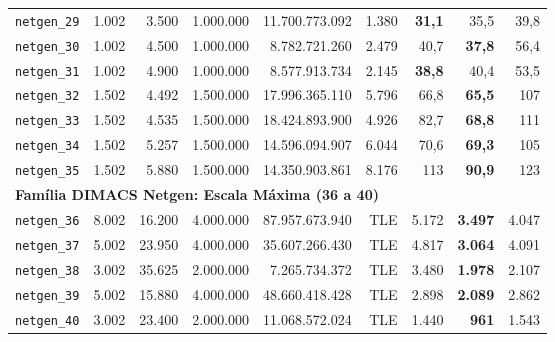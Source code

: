 \begin{longtable}{lrrrrrrrr}
\texttt{netgen\_29} & 1.002 & 3.500 & 1.000.000 & 11.700.773.092 & 1.380 & \textbf{31,1} & 35,5 & 39,8 \\
\texttt{netgen\_30} & 1.002 & 4.500 & 1.000.000 & 8.782.721.260 & 2.479 & 40,7 & \textbf{37,8} & 56,4 \\
\texttt{netgen\_31} & 1.002 & 4.900 & 1.000.000 & 8.577.913.734 & 2.145 & \textbf{38,8} & 40,4 & 53,5 \\
\texttt{netgen\_32} & 1.502 & 4.492 & 1.500.000 & 17.996.365.110 & 5.796 & 66,8 & \textbf{65,5} & 107 \\
\texttt{netgen\_33} & 1.502 & 4.535 & 1.500.000 & 18.424.893.900 & 4.926 & 82,7 & \textbf{68,8} & 111 \\
\texttt{netgen\_34} & 1.502 & 5.257 & 1.500.000 & 14.596.094.907 & 6.044 & 70,6 & \textbf{69,3} & 105 \\
\texttt{netgen\_35} & 1.502 & 5.880 & 1.500.000 & 14.350.903.861 & 8.176 & 113 & \textbf{90,9} & 123 \\
\midrule
\multicolumn{9}{l}{\textbf{Família DIMACS Netgen: Escala Máxima (36 a 40)}} \\
\midrule
\texttt{netgen\_36} & 8.002 & 16.200 & 4.000.000 & 87.957.673.940 & TLE & 5.172 & \textbf{3.497} & 4.047 \\
\texttt{netgen\_37} & 5.002 & 23.950 & 4.000.000 & 35.607.266.430 & TLE & 4.817 & \textbf{3.064} & 4.091 \\
\texttt{netgen\_38} & 3.002 & 35.625 & 2.000.000 & 7.265.734.372 & TLE & 3.480 & \textbf{1.978} & 2.107 \\
\texttt{netgen\_39} & 5.002 & 15.880 & 4.000.000 & 48.660.418.428 & TLE & 2.898 & \textbf{2.089} & 2.862 \\
\texttt{netgen\_40} & 3.002 & 23.400 & 2.000.000 & 11.068.572.024 & TLE & 1.440 & \textbf{961} & 1.543 \\
\end{longtable}
\endgroup
